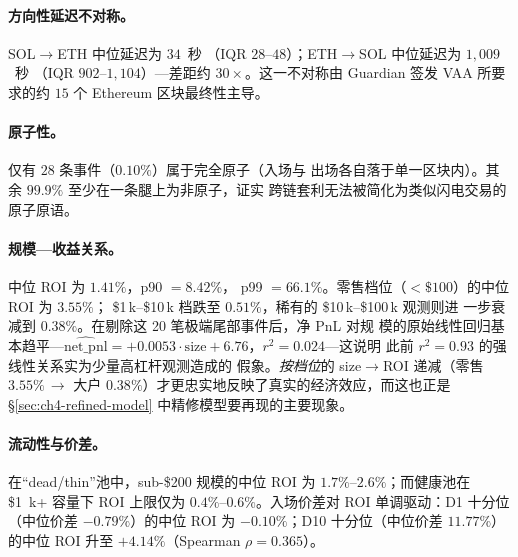 \documentclass[11pt,a4paper]{ctexart}
\newcommand{\SolEth}{SOL$\to$ETH}
\newcommand{\EthSol}{ETH$\to$SOL}
\begin{document}
\paragraph{方向性延迟不对称。} \SolEth{} 中位延迟为 $34$~秒
（IQR $28$--$48$）；\EthSol{} 中位延迟为 $1{,}009$~秒
（IQR $902$--$1{,}104$）---差距约 $30\times$。这一不对称由 Guardian
签发 VAA 所要求的约 $15$ 个 Ethereum 区块最终性主导。

\paragraph{原子性。} 仅有 $28$ 条事件（$0.10\%$）属于完全原子（入场与
出场各自落于单一区块内）。其余 $99.9\%$ 至少在一条腿上为非原子，证实
跨链套利无法被简化为类似闪电交易的原子原语。

\paragraph{规模---收益关系。} 中位 ROI 为 $1.41\%$，p90 $=8.42\%$，
p99 $=66.1\%$。零售档位（$<\$100$）的中位 ROI 为 $3.55\%$；
\$1\,k--\$10\,k 档跌至 $0.51\%$，稀有的 \$10\,k--\$100\,k 观测则进
一步衰减到 $0.38\%$。在剔除这 20 笔极端尾部事件后，净 PnL 对规
模的原始线性回归基本趋平---$\widehat{\text{net\_pnl}} =
+0.0053\cdot\text{size} + 6.76$，$r^{2}\!=\!0.024$---这说明
此前 $r^{2}\!=\!0.93$ 的强线性关系实为少量高杠杆观测造成的
假象。\emph{按档位}的 size$\to$ROI 递减（零售 $3.55\%\,\to$ 大户
$0.38\%$）才更忠实地反映了真实的经济效应，而这也正是
\S\ref{sec:ch4-refined-model} 中精修模型要再现的主要现象。

\paragraph{流动性与价差。} 在“dead/thin”池中，sub-\$200 规模的中位
ROI 为 $1.7\%$--$2.6\%$；而健康池在 \$1~k+ 容量下 ROI 上限仅为
$0.4\%$--$0.6\%$。入场价差对 ROI 单调驱动：D1 十分位（中位价差
$-0.79\%$）的中位 ROI 为 $-0.10\%$；D10 十分位（中位价差 $11.77\%$）
的中位 ROI 升至 $+4.14\%$（Spearman $\rho=0.365$）。
\end{document}
